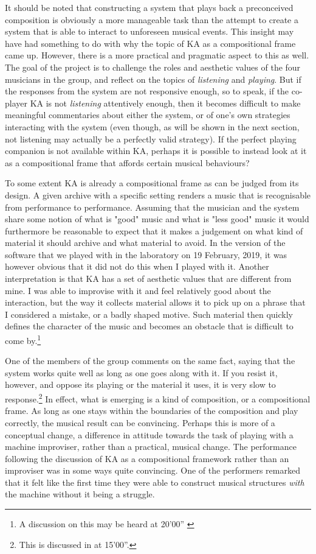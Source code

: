 \documentclass[11pt]{article}
\begin{document}
It should be noted that constructing a system that plays back a
preconceived composition is obviously a more manageable task than the
attempt to create a system that is able to interact to unforeseen
musical events. This insight may have had something to do with why the
topic of KA as a compositional frame came up. However, there is a more
practical and pragmatic aspect to this as well. The goal of the
project is to challenge the roles and aesthetic values of the four
musicians in the group, and reflect on the topics of \emph{listening}
and \emph{playing}. But if the responses from the system are not
responsive enough, so to speak, if the co-player KA is not
\emph{listening} attentively enough, then it becomes difficult to make
meaningful commentaries about either the system, or of one's own
strategies interacting with the system (even though, as will be shown
in the next section, not listening may actually be a perfectly valid
strategy). If the perfect playing companion is not available within
KA, perhaps it is possible to instead look at it as a compositional
frame that affords certain musical behaviours?

To some extent KA is already a compositional frame as can be judged
from its design. A given archive with a specific setting renders a
music that is recognisable from performance to performance. Assuming
that the musician and the system share some notion of what is "good"
music and what is "less good" music it would furthermore be reasonable
to expect that it makes a judgement on what kind of material it should
archive and what material to avoid. In the version of the software
that we played with in the laboratory on 19 February, 2019, it was
however obvious that it did not do this when I played with it. Another
interpretation is that KA has a set of aesthetic values that are
different from mine. I was able to improvise with it and feel
relatively good about the interaction, but the way it collects
material allows it to pick up on a phrase that I considered a mistake,
or a badly shaped motive. Such material then quickly defines the
character of the music and becomes an obstacle that is difficult to
come by.\footnote{A discussion on this may be heard at 20'00''
    \citep{grydeland2019-1}}

One of the members of the group comments on the same fact, saying that
the system works quite well as long as one goes along with it. If you
resist it, however, and oppose its playing or the material it uses, it
is very slow to response.\footnote{This is discussed in
    \citet{grydeland2019-1} at 15'00''.} In effect, what is emerging
is a kind of composition, or a compositional frame. As long as one
stays within the boundaries of the composition and play correctly, the
musical result can be convincing. Perhaps this is more of a conceptual
change, a difference in attitude towards the task of playing with a
machine improviser, rather than a practical, musical change. The
performance following the discussion of KA as a compositional
framework rather than an improviser was in some ways quite
convincing. One of the performers remarked that it felt like the first
time they were able to construct musical structures \emph{with} the
machine without it being a struggle.
\end{document}
